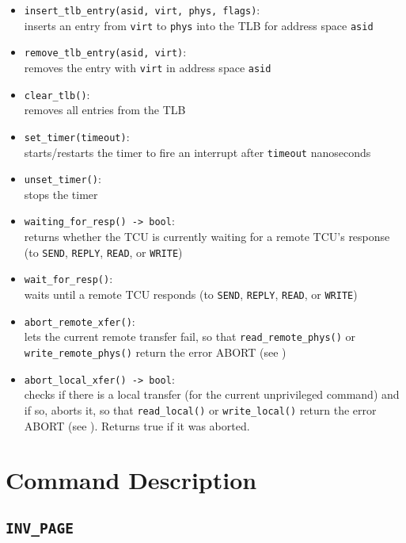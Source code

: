 \begin{itemize}
  \item \texttt{insert\_tlb\_entry(asid, virt, phys, flags)}: \\
  inserts an entry from \texttt{virt} to \texttt{phys} into the TLB for address space \texttt{asid}
  \item \texttt{remove\_tlb\_entry(asid, virt)}:\\
  removes the entry with \texttt{virt} in address space \texttt{asid}
  \item \texttt{clear\_tlb()}:\\
  removes all entries from the TLB \extend{}
  \item \texttt{set\_timer(timeout)}: \\
  starts/restarts the timer to fire an interrupt after \texttt{timeout} nanoseconds
  \item \texttt{unset\_timer()}:\\
  stops the timer
  \item \texttt{waiting\_for\_resp() -> bool}:\\
  returns whether the TCU is currently waiting for a remote TCU's response (to \texttt{SEND},
  \texttt{REPLY}, \texttt{READ}, or \texttt{WRITE})
  \item \texttt{wait\_for\_resp()}:\\
  waits until a remote TCU responds (to \texttt{SEND}, \texttt{REPLY}, \texttt{READ}, or
  \texttt{WRITE})
  \item \texttt{abort\_remote\_xfer()}:\\
  lets the current remote transfer fail, so that \texttt{read\_remote\_phys()} or \texttt{write\_remote\_phys()}
  return the error ABORT (see )
  \item \texttt{abort\_local\_xfer() -> bool}:\\
  checks if there is a local transfer (for the current unprivileged command) and if so, aborts it,
  so that \texttt{read\_local()} or \texttt{write\_local()} return the error ABORT (see
  ). Returns true if it was aborted. \extend{}
\end{itemize}

\section{Command Description}

\subsection{\texttt{INV\_PAGE}}

